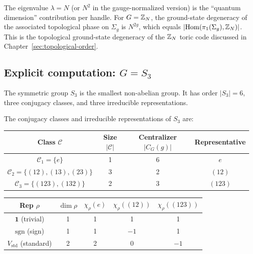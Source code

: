 \begin{remark}\label{rem:toric-code-connection}
The eigenvalue $\lambda = N$ (or $N^2$ in the gauge-normalized version) is the ``quantum dimension'' contribution per handle. For $G = \mathbb{Z}_N$, the ground-state degeneracy of the associated topological phase on $\Sigma_g$ is $N^{2g}$, which equals $|\mathrm{Hom}(\pi_1(\Sigma_g), \mathbb{Z}_N)|$. This is the topological ground-state degeneracy of the $\mathbb{Z}_N$ toric code discussed in Chapter~\ref{sec:topological-order}.
\end{remark}

\subsection{Explicit computation: \texorpdfstring{$G = S_3$}{G = S3}}

The symmetric group $S_3$ is the smallest non-abelian group. It has order $|S_3| = 6$, three conjugacy classes, and three irreducible representations.

\begin{proposition}\label{prop:S3-reps}
The conjugacy classes and irreducible representations of $S_3$ are:
\begin{center}
\renewcommand{\arraystretch}{1.3}
\begin{tabular}{c c c c}
\hline
Class $\mathcal{C}$ & Size $|\mathcal{C}|$ & Centralizer $|C_G(g)|$ & Representative \\
\hline
$\mathcal{C}_1 = \{e\}$ & 1 & 6 & $e$ \\
$\mathcal{C}_2 = \{(12),(13),(23)\}$ & 3 & 2 & $(12)$ \\
$\mathcal{C}_3 = \{(123),(132)\}$ & 2 & 3 & $(123)$ \\
\hline
\end{tabular}
\end{center}
\medskip
\begin{center}
\renewcommand{\arraystretch}{1.3}
\begin{tabular}{c c c c c}
\hline
Rep $\rho$ & $\dim \rho$ & $\chi_\rho(e)$ & $\chi_\rho((12))$ & $\chi_\rho((123))$ \\
\hline
$\mathbf{1}$ (trivial) & 1 & 1 & 1 & 1 \\
$\mathrm{sgn}$ (sign) & 1 & 1 & $-1$ & 1 \\
$V_{\mathrm{std}}$ (standard) & 2 & 2 & 0 & $-1$ \\
\hline
\end{tabular}
\end{center}
\end{proposition}

